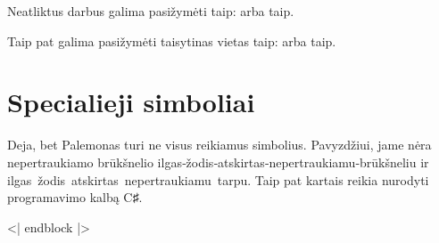 Neatliktus darbus galima pasižymėti taip: 
arba taip.

Taip pat galima pasižymėti taisytinas vietas taip:  arba taip.

\section{Specialieji simboliai}

\begin{sloppypar}
  Deja, bet Palemonas turi ne visus reikiamus simbolius. Pavyzdžiui,
  jame nėra nepertraukiamo brūkšnelio
  ilgas‑žodis‑atskirtas‑nepertraukiamu‑brūkšneliu ir
  ilgas žodis atskirtas nepertraukiamu tarpu.
  Taip pat kartais reikia nurodyti programavimo kalbą C♯.
\end{sloppypar}

<| endblock |>

